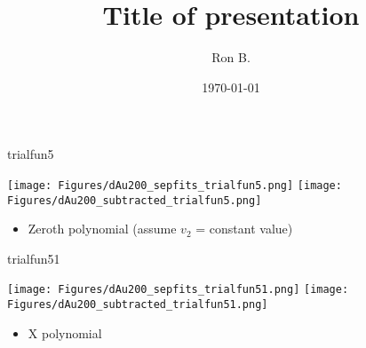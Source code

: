 \documentclass[aspectratio=169,compress,10pt]{beamer}
\title[Title of presentation]{Title of presentation}
\author[Ron B.]{Ron B.}
\institute[UNCG]{\normalsize University of North Carolina Greensboro}
\date[\today]{\today}
\begin{document}


\begin{frame}{trialfun5}
\begin{center}
\texttt{[image: Figures/dAu200\_sepfits\_trialfun5.png]}
\texttt{[image: Figures/dAu200\_subtracted\_trialfun5.png]}
\end{center}
\begin{itemize}
\item Zeroth polynomial (assume $v_2$ = constant value)
\end{itemize}
\end{frame}




\begin{frame}{trialfun51}
\begin{center}
\texttt{[image: Figures/dAu200\_sepfits\_trialfun51.png]}
\texttt{[image: Figures/dAu200\_subtracted\_trialfun51.png]}
\end{center}
\begin{itemize}
\item X polynomial
\end{itemize}
\end{frame}


\end{document}
